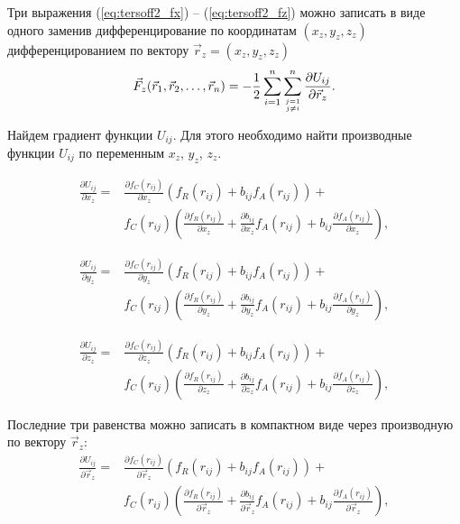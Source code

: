 Три выражения (\ref{eq:tersoff2_fx}) -- (\ref{eq:tersoff2_fz}) можно записать в виде одного заменив дифференцирование по координатам $(x_z, y_z, z_z)$ дифференцированием по вектору $\vec{r}_z = (x_z, y_z, z_z)$
\begin{equation}
\vec{F}_z(\vec{r}_1, \vec{r}_2, \ldots, \vec{r}_n)  = - \frac{1}{2}\sum_{i = 1}^{n}\sum_{j = 1 \atop j \neq i}^{n} \frac{\partial U_{ij}}{\partial \vec{r}_z} .
\end{equation}

Найдем градиент функции $U_{ij}$. Для этого необходимо найти производные функции $U_{ij}$ по переменным $x_z$,  $y_z$,  $z_z$.

\begin{align*}
 \frac{\partial U_{ij}}{\partial x_z} = & \frac{\partial f_C(r_{ij})}{\partial x_z}\left( f_R(r_{ij}) + b_{ij}f_A(r_{ij})\right) + \\
	& f_C(r_{ij}) \left( \frac{\partial f_R(r_{ij})}{\partial x_z} + 
	\frac{\partial b_{ij}}{\partial x_z}f_A(r_{ij}) +
	b_{ij} \frac{\partial f_A(r_{ij})}{\partial x_z} \right),
\end{align*}

\begin{align*}
 \frac{\partial U_{ij}}{\partial y_z} = & \frac{\partial f_C(r_{ij})}{\partial y_z}\left( f_R(r_{ij}) + b_{ij}f_A(r_{ij})\right) + \\
	& f_C(r_{ij}) \left( \frac{\partial f_R(r_{ij})}{\partial y_z} + 
	\frac{\partial b_{ij}}{\partial y_z}f_A(r_{ij}) +
	b_{ij} \frac{\partial f_A(r_{ij})}{\partial y_z} \right),
\end{align*}

\begin{align*}
 \frac{\partial U_{ij}}{\partial z_z} = & \frac{\partial f_C(r_{ij})}{\partial z_z}\left( f_R(r_{ij}) + b_{ij}f_A(r_{ij})\right) + \\
	& f_C(r_{ij}) \left( \frac{\partial f_R(r_{ij})}{\partial z_z} + 
	\frac{\partial b_{ij}}{\partial z_z}f_A(r_{ij}) +
	b_{ij} \frac{\partial f_A(r_{ij})}{\partial z_z} \right),
\end{align*}

Последние три равенства можно записать в компактном виде через производную по вектору $\vec{r}_z$:
\begin{align*}
 \frac{\partial U_{ij}}{\partial \vec{r}_z} = & \frac{\partial f_C(r_{ij})}{\partial \vec{r}_z}\left( f_R(r_{ij}) + b_{ij}f_A(r_{ij})\right) + \\
	& f_C(r_{ij}) \left( \frac{\partial f_R(r_{ij})}																									{\partial \vec{r}_z} + 
	\frac{\partial b_{ij}}{\partial \vec{r}_z}f_A(r_{ij}) +
	b_{ij} \frac{\partial f_A(r_{ij})}{\partial \vec{r}_z} \right),
\end{align*}

